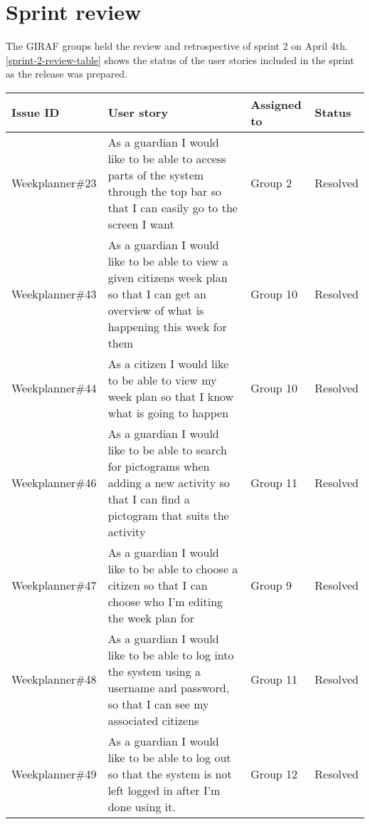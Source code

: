 \section{Sprint review}
The GIRAF groups held the review and retrospective of sprint 2 on April 4th.
\autoref{sprint-2-review-table} shows the status of the user stories included in the sprint as the release was prepared.

\begin{longtable}{|p{2.8cm}|p{7cm}|p{1.5cm}|p{1.8cm}|}
    \hline
    Issue ID        & User story                                                                                                                                                                               & Assigned to  & Status     \\ \hline
    Weekplanner\#23 & As a guardian I would like to be able to access parts of the system through the top bar so that I can easily go to the screen I want                                                     & Group 2         & Resolved      \\ \hline
    Weekplanner\#43 & As a guardian I would like to be able to view a given citizens week plan so that I can get an overview of what is happening this week for them                                           & Group 10        & Resolved      \\ \hline
    Weekplanner\#44 & As a citizen I would like to be able to view my week plan so that I know what is going to happen                                                                                         & Group 10        & Resolved     \\ \hline
    Weekplanner\#46 & As a guardian I would like to be able to search for pictograms when adding a new activity so that I can find a pictogram that suits the activity                                         & Group 11        & Resolved   \\ \hline
    Weekplanner\#47 & As a guardian I would like to be able to choose a citizen so that I can choose who I’m editing the week plan for                                                                         & Group 9         & Resolved   \\ \hline
    Weekplanner\#48 & As a guardian I would like to be able to log into the system using a username and password, so that I can see my associated citizens                                                     & Group 11        & Resolved  \\ \hline
    Weekplanner\#49 & As a guardian I would like to be able to log out so that the system is not left logged in after I’m done using it.                                                                       & Group 12        & Resolved     \\ \hline

\end{longtable}
